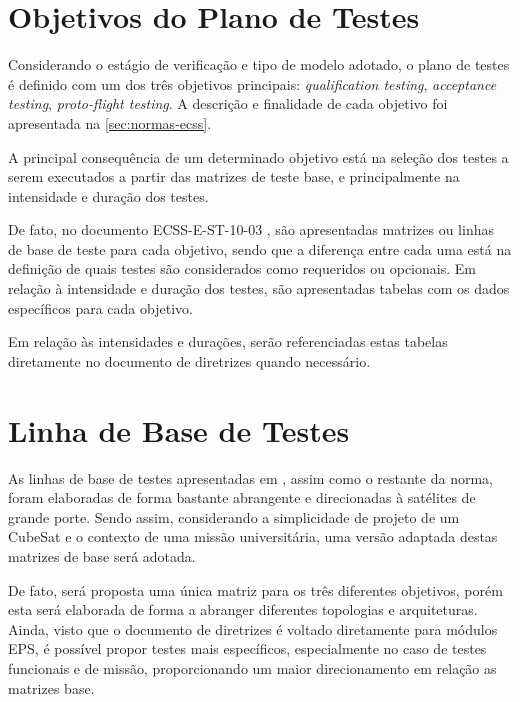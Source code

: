 \section{Objetivos do Plano de Testes} \label{sec:objetivo-testes}


Considerando o estágio de verificação e tipo de modelo adotado, o plano de testes é definido com um dos três objetivos principais: \textit{qualification testing}, \textit{acceptance testing}, \textit{proto-flight testing}.
A descrição e finalidade de cada objetivo foi apresentada na \autoref{sec:normas-ecss}.

A principal consequência de um determinado objetivo está na seleção dos testes a serem executados a partir das matrizes de teste base, e principalmente na intensidade e duração dos testes.

De fato, no documento ECSS-E-ST-10-03 \cite{ecss-e-st-10-03}, são apresentadas matrizes ou linhas de base de teste para cada objetivo, sendo que a diferença entre cada uma está na definição de quais testes são considerados como requeridos ou opcionais.
Em relação à intensidade e duração dos testes, são apresentadas tabelas com os dados específicos para cada objetivo.

Em relação às intensidades e durações, serão referenciadas estas tabelas diretamente no documento de diretrizes quando necessário.






\section{Linha de Base de Testes} \label{sec:linhas-base}

As linhas de base de testes apresentadas em \textcite{ecss-e-st-10-03}, assim como o restante da norma, foram elaboradas de forma bastante abrangente e direcionadas à satélites de grande porte.
Sendo assim, considerando a simplicidade de projeto de um CubeSat e o contexto de uma missão universitária, uma versão adaptada destas matrizes de base será adotada.

De fato, será proposta uma única matriz para os três diferentes objetivos, porém esta será elaborada de forma a abranger diferentes topologias e arquiteturas.
Ainda, visto que o documento de diretrizes é voltado diretamente para módulos \gls{EPS}, é possível propor testes mais específicos, especialmente no caso de testes funcionais e de missão, proporcionando um maior direcionamento em relação as matrizes base.

